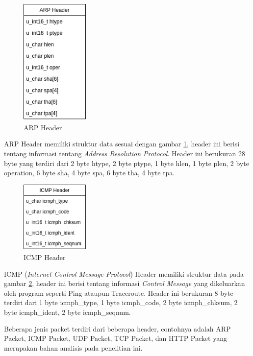 \documentclass[./skripsi.tex]{subfiles}
\begin{document}
\begin{figure}%
    \centering
    \includegraphics[width=0.3\textwidth]{public/assets/img/ARPHeader.png}
    \caption{ARP Header}
    \label{fig:arpheader}
\end{figure}
\par ARP Header memiliki struktur data sesuai dengan gambar \ref{fig:arpheader}, header ini berisi tentang informasi tentang \textit{Address Resolution Protocol}. Header ini berukuran 28 byte yang terdiri dari 2 byte htype, 2 byte ptype, 1 byte hlen, 1 byte plen, 2 byte operation, 6 byte sha, 4 byte spa, 6 byte tha, 4 byte tpa.
\begin{figure}%
    \centering
    \includegraphics[width=0.3\textwidth]{public/assets/img/ICMPHeader.png}
    \caption{ICMP Header}
    \label{fig:icmpheader}
\end{figure}
\par ICMP (\textit{Internet Control Message Protocol}) Header memiliki struktur data pada gambar \ref{fig:icmpheader}, header ini berisi tentang informasi \textit{Control Message} yang dikeluarkan oleh program seperti Ping ataupun Traceroute. Header ini berukuran 8 byte terdiri dari 1 byte icmph\_type, 1 byte icmph\_code, 2 byte icmph\_chksum, 2 byte icmph\_ident, 2 byte icmph\_seqnum.
\par Beberapa jenis packet terdiri dari beberapa header, contohnya adalah ARP Packet, ICMP Packet, UDP Packet, TCP Packet, dan HTTP Packet yang merupakan bahan analisis pada penelitian ini.
\end{document}
